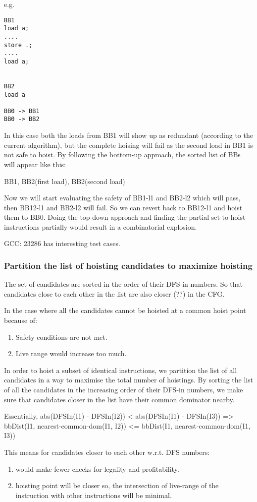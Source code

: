 \documentclass{sig-alternate}
\begin{document}
e.g.
\begin{verbatim}
BB1
load a;
....
store .;
....
load a;


BB2
load a

BB0 -> BB1
BB0 -> BB2
\end{verbatim}

In this case both the loads from BB1 will show up as redundant
(according to the current algorithm), but the complete hoising will
fail as the second load in BB1 is not safe to hoist. By following the
bottom-up approach, the sorted list of BBs will appear like this:

{ BB1, BB2(first load), BB2(second load) }

Now we will start evaluating the safety of BB1-l1 and BB2-l2 which
will pass, then BB12-l1 and BB2-l2 will fail.  So we can revert back
to BB12-l1 and hoist them to BB0. Doing the top down approach and
finding the partial set to hoist instructions partially would result
in a combinatorial explosion.

GCC: 23286 has interesting test cases.

\subsubsection{Partition the list of hoisting candidates to maximize hoisting}
\label{subsec:partition}
The set of candidates are sorted in the order of their DFS-in
numbers. So that candidates close to each other in the list are also
closer (??) in the CFG.

In the case where all the candidates cannot be hoisted at a common
hoist point because of:
\begin{enumerate}
\item Safety conditions are not met.
\item Live range would increase too much.
\end{enumerate}

In order to hoist a subset of identical instructions, we partition the
list of all candidates in a way to maximise the total number of
hoistings.  By sorting the list of all the candidates in the
increasing order of their DFS-in numbers, we make sure that candidates
closer in the list have their common dominator nearby.

Essentially,
abs(DFSIn(I1) - DFSIn(I2)) < abs(DFSIn(I1) - DFSIn(I3))
=> bbDist(I1, nearest-common-dom(I1, I2)) <= bbDist(I1, nearest-common-dom(I1, I3))

This means for candidates closer to each other w.r.t. DFS numbers:
\begin{enumerate}
\item would make fewer checks for legality and profitability.
\item hoisting point will be closer so, the intersection of live-range of the
  instruction with other instructions will be minimal.
\end{enumerate}
\end{document}
